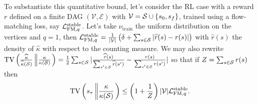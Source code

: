 \documentclass{article}
\theoremstyle{plain}
\newtheorem{corollary}[theorem]{Corollary}
\theoremstyle{definition}
\theoremstyle{remark}
\theoremstyle{fact}
\begin{document}
To substantiate this quantitative bound, let's consider the RL case with a reward $r$ defined on a finite DAG $(\mathcal V,\mathcal E)$ with $\mathcal V=\mathcal S\cup\{s_0,s_f\}$, trained using a flow-matching loss, say $\mathcal L_{\mathrm{FM},q}^{\mathrm{stable}}$. Let's take $\nu_{\mathrm{train}}$ the uniform distribution on the vertices and $q=1$, then $\mathcal L_{\mathrm{FM},q}^{\mathrm{stable}}= \frac{1}{|\mathcal V|}\left(\delta + \sum_{s\in\mathcal S} |\widehat r(s) - r(s)|\right)$ with $\widehat r(s)$ the density of $\widehat \kappa$ with respect to the counting measure.
We may also rewrite $\mathrm{TV}\left(\frac{\widehat{\kappa}}{\widehat{\kappa}(\mathcal S)} \left\| \frac{\kappa}{\kappa(\mathcal S )} \right.\right) =\frac{1}{2}\sum_{s\in\mathcal S} |\frac{\widehat r(s)}{\sum_{s'\in \mathcal S}\widehat r(s')} - \frac{ r(s)}{\sum_{s'\in \mathcal S} r(s')}|$ 
so that if $Z=\sum_{s\in \mathcal S} r(s)$ then
\begin{equation}
     \mathrm{TV}\left(s_\tau \left\| \frac{\kappa}{\kappa(\mathcal S )} \right.\right) \leq \left( 1+\frac{1}{Z}\right)|\mathcal V| \mathcal L_{\mathrm{FM},q}^{\mathrm{stable}}.
\end{equation}

    
\end{document}
